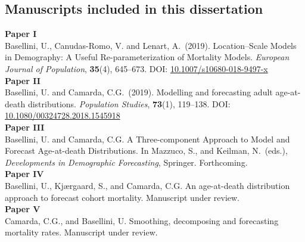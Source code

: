\documentclass[Thesis]{subfiles}
\begin{document}
\subsection*{Manuscripts included in this dissertation}
\medskip
\textbf{Paper I}\\
Basellini, U., Canudas-Romo, V. and Lenart, A.~(2019). Location--Scale Models in Demography: A Useful Re-parameterization of Mortality Models. \textit{European Journal of Population}, \textbf{35}(4), 645--673. DOI: \href{https://link.springer.com/article/10.1007/s10680-018-9497-x}{10.1007/s10680-018-9497-x}
\vspace{0.5cm}\\
\textbf{Paper II}\\
Basellini, U. and Camarda, C.G.~(2019). Modelling and forecasting adult age-at-death distributions. \textit{Population Studies}, \textbf{73}(1), 119--138. DOI: \href{https://www.tandfonline.com/doi/full/10.1080/00324728.2018.1545918}{10.1080/00324728.2018.1545918}%
\vspace{0.5cm}\\
\textbf{Paper III}\\
Basellini, U. and Camarda, C.G. A Three-component Approach to Model and Forecast Age-at-death Distributions. In Mazzuco, S., and Keilman, N.~(eds.), \textit{Developments in Demographic Forecasting}, Springer. Forthcoming.
\vspace{0.5cm}\\
\textbf{Paper IV}\\
Basellini, U., Kj{\ae}rgaard, S., and Camarda, C.G. An age-at-death distribution approach to forecast cohort mortality. Manuscript under review.
\vspace{0.5cm}\\
\textbf{Paper V}\\
Camarda, C.G., and Basellini, U. Smoothing, decomposing and forecasting mortality rates. Manuscript under review.

\newpage
\end{document}
